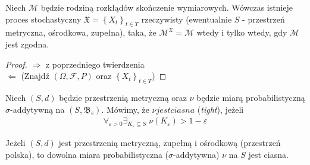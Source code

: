 \begin{twr}
Niech $ \mathcal M $ będzie rodziną rozkłądów skończenie wymiarowych. Wówczas istnieje proces stochastyczny $ \mathfrak X=\left\{X_t\right\}_{t\in T} $ rzeczywisty (ewentualnie $ S $ - przestrzeń metryczna, ośrodkowa, zupełna), taka, że $ \mathcal M^\mathfrak X=\mathcal M $ wtedy i tylko wtedy, gdy $ \mathcal M $ jest zgodna.
\begin{proof}
$ \Rightarrow $ z poprzedniego twierdzenia\\
$ \Leftarrow $ (Znajdź $ \left(\Omega,\mathcal F,P\right) $ oraz $ \left\{X_t\right\}_{t\in T} $)
\end{proof}
\end{twr}
\begin{defi}
Niech $ (S,d) $ będzie przestrzenią metryczną oraz $ \nu $ będzie miarą probabilistyczną $\sigma $-addytywną na $ (S,\mathfrak B_s) $. Mówimy, że $ \nu jest ciasna $ (\emph{tight}), jeżeli
\begin{gather*}
\forall_{\varepsilon>0}\exists_{K_\varepsilon\subseteq S}
\;
\nu\left(K_\varepsilon\right)>1-\varepsilon
\end{gather*}
\end{defi}
\begin{twr}[Ulama]
Jeżeli $ (S,d) $ jest przestrzenią metryczną, zupełną i ośrodkową (przestrzeń polska), to dowolna miara probabilistyczna ($ \sigma $-addytywna) $ \nu $ na $ S $ jest ciasna.
\end{twr}